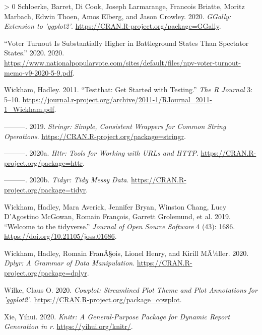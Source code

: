 \documentclass[
]{article}
\newlength{\cslhangindent}
\newenvironment{CSLReferences}[3] %
 {%
  \setlength{\parindent}{0pt}
  \ifodd #1 \everypar{\setlength{\hangindent}{\cslhangindent}}\ignorespaces\fi
  \ifnum #2 > 0
  \setlength{\parskip}{#3\baselineskip}
  \fi
 }%
 {}
\begin{document}
\begin{CSLReferences}{1}{0}
\leavevmode\hypertarget{ref-GGally}{}%
Schloerke, Barret, Di Cook, Joseph Larmarange, Francois Briatte, Moritz
Marbach, Edwin Thoen, Amos Elberg, and Jason Crowley. 2020.
\emph{GGally: Extension to 'ggplot2'}.
\url{https://CRAN.R-project.org/package=GGally}.

\leavevmode\hypertarget{ref-US_voter_turnout}{}%
{``Voter Turnout Is Substantially Higher in Battleground States Than
Spectator States.''} 2020. 2020.
\url{https://www.nationalpopularvote.com/sites/default/files/npv-voter-turnout-memo-v9-2020-5-9.pdf}.

\leavevmode\hypertarget{ref-testthat}{}%
Wickham, Hadley. 2011. {``Testthat: Get Started with Testing.''}
\emph{The R Journal} 3: 5--10.
\url{https://journal.r-project.org/archive/2011-1/RJournal_2011-1_Wickham.pdf}.

\leavevmode\hypertarget{ref-stringr}{}%
---------. 2019. \emph{Stringr: Simple, Consistent Wrappers for Common
String Operations}. \url{https://CRAN.R-project.org/package=stringr}.

\leavevmode\hypertarget{ref-httr}{}%
---------. 2020a. \emph{Httr: Tools for Working with URLs and HTTP}.
\url{https://CRAN.R-project.org/package=httr}.

\leavevmode\hypertarget{ref-tidyr}{}%
---------. 2020b. \emph{Tidyr: Tidy Messy Data}.
\url{https://CRAN.R-project.org/package=tidyr}.

\leavevmode\hypertarget{ref-tidyverse}{}%
Wickham, Hadley, Mara Averick, Jennifer Bryan, Winston Chang, Lucy
D'Agostino McGowan, Romain François, Garrett Grolemund, et al. 2019.
{``Welcome to the {tidyverse}.''} \emph{Journal of Open Source Software}
4 (43): 1686. \url{https://doi.org/10.21105/joss.01686}.

\leavevmode\hypertarget{ref-dplyr}{}%
Wickham, Hadley, Romain FranÃ§ois, Lionel Henry, and Kirill MÃ¼ller.
2020. \emph{Dplyr: A Grammar of Data Manipulation}.
\url{https://CRAN.R-project.org/package=dplyr}.

\leavevmode\hypertarget{ref-cowplot}{}%
Wilke, Claus O. 2020. \emph{Cowplot: Streamlined Plot Theme and Plot
Annotations for 'ggplot2'}.
\url{https://CRAN.R-project.org/package=cowplot}.

\leavevmode\hypertarget{ref-knitr}{}%
Xie, Yihui. 2020. \emph{Knitr: A General-Purpose Package for Dynamic
Report Generation in r}. \url{https://yihui.org/knitr/}.

\end{CSLReferences}
\end{document}
